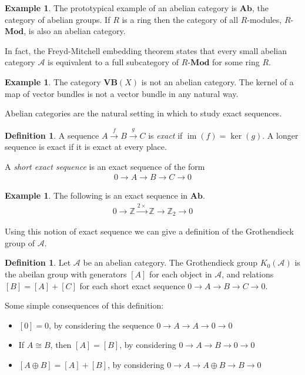 \documentclass[10pt,a4paper]{article}
\DeclareMathOperator{\im}{im}
\theoremstyle{definition}
\newtheorem{example}[theorem]{Example}
\newtheorem{definition}[theorem]{Definition}
\begin{document}
\begin{example}
The prototypical example of an abelian category is $\mathbf{Ab}$, the category of abelian groups. If $R$ is a ring then the category of all $R$-modules, $R$-$\mathbf{Mod}$, is also an abelian category.
\end{example}

In fact, the Freyd-Mitchell embedding theorem states that every small abelian category $\mathcal{A}$ is equivalent to a full subcategory of $R$-$\mathbf{Mod}$ for some ring $R$.

\begin{example}
The category $\mathbf{VB}(X)$ is not an abelian category. The kernel of a map of vector bundles is not a vector bundle in any natural way.
\end{example}

Abelian categories are the natural setting in which to study exact sequences.

\begin{definition}
A sequence $A \xrightarrow{f} B \xrightarrow{g} C$ is \emph{exact} if $\im(f) = \ker(g)$. A longer sequence is exact if it is exact at every place.

A \emph{short exact sequence} is an exact sequence of the form
\begin{align*}
0 \to A \to B \to C \to 0
\end{align*}
\end{definition}

\begin{example}
The following is an exact sequence in $\mathbf{Ab}$.
\begin{align*}
0 \to \mathbb{Z} \xrightarrow{2\times} \mathbb{Z} \to \mathbb{Z}_2 \to 0
\end{align*}
\end{example}

Using this notion of exact sequence we can give a definition of the Grothendieck group of $\mathcal{A}$.

\begin{definition}
Let $\mathcal{A}$ be an abelian category. The Grothendieck group $K_0(\mathcal{A})$ is the abeilan group with generators $[A]$ for each object in $\mathcal{A}$, and relations $[B] = [A] + [C]$ for each short exact sequence $0 \to A \to B \to C \to 0$.
\end{definition}

Some simple consequences of this definition:
\begin{itemize}
\itemsep0em
\item $[0] = 0$, by considering the sequence $0 \to A \to A \to 0 \to 0$
\item If $A \cong B$, then $[A] = [B]$, by considering $0 \to A \to B \to 0 \to 0$
\item $[A \oplus B] = [A] + [B]$, by considering $0 \to A \to A \oplus B \to B \to 0$
\end{itemize}
\end{document}
